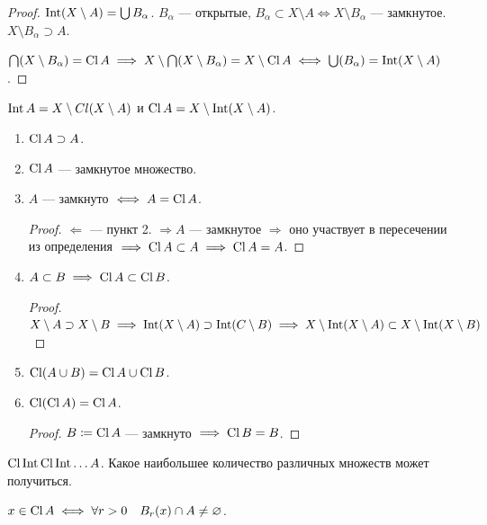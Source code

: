 \begin{proof}
    $\operatorname{Int}(X \setminus A) = \bigcup B_{\alpha}$.  $B_\alpha$ --- открытые,  $B_\alpha \subset X \setminus A \iff X \setminus B_\alpha$ --- замкнутое. $X \setminus B_\alpha \supset A$.

    $\bigcap(X \setminus B_\alpha) = \operatorname{Cl} A \implies X \setminus \bigcap (X \setminus B_\alpha) = X \setminus \operatorname{Cl} A \iff \bigcup(B_\alpha) = \operatorname{Int}(X \setminus A)$.
\end{proof}
\begin{consequence}
    $\operatorname{Int} A = X \setminus Cl(X \setminus A)$ и  $\operatorname{Cl} A = X \setminus \operatorname{Int}(X \setminus A)$.
\end{consequence}
\begin{properties}
    \begin{enumerate}
        \item $\operatorname{Cl} A \supset A$.
        \item  $\operatorname{Cl} A$ --- замкнутое множество. 
        \item $A$ --- замкнуто  $\iff A = \operatorname{Cl} A$.
            \begin{proof}
                $\Leftarrow$ --- пункт 2.  $\Rightarrow A$ --- замкнутое  $\Rightarrow$ оно участвует в пересечении из определения  $\implies \operatorname{Cl} A \subset A \implies \operatorname{Cl} A = A$.
            \end{proof}
        \item $A \subset B \implies \operatorname{Cl} A \subset \operatorname{Cl} B$.
             \begin{proof}
                $X \setminus A \supset X \setminus B \implies \operatorname{Int}(X \setminus A) \supset \operatorname{Int}(C \setminus B) \implies X \setminus \operatorname{Int}(X \setminus A) \subset X \setminus \operatorname{Int}(X \setminus B)$
            \end{proof}
        \item $\operatorname{Cl}(A \cup B) = \operatorname{Cl} A \cup \operatorname{Cl} B$.
        \item  $\operatorname{Cl}(\operatorname{Cl} A) = \operatorname{Cl} A$.
             \begin{proof}
                $B \coloneqq \operatorname{Cl} A$ --- замкнуто  $\implies \operatorname{Cl} B = B$.
            \end{proof}
    \end{enumerate}
\end{properties}
\begin{exerc}
    $\operatorname{Cl} \operatorname{Int} \operatorname{Cl} \operatorname{Int} \ldots A$. Какое наибольшее количество различных множеств может получиться.
\end{exerc}
\begin{theorem}
    $x \in \operatorname{Cl} A \iff \forall r > 0\quad B_r(x) \cap A \neq \varnothing$.
\end{theorem}

